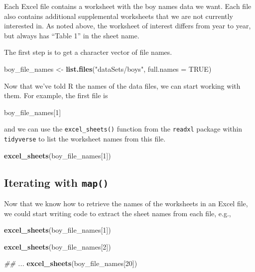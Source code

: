 \documentclass[]{book}
\newenvironment{Shaded}{\begin{snugshade}}{\end{snugshade}}
\newcommand{\CommentTok}[1]{\textcolor[rgb]{0.56,0.35,0.01}{\textit{#1}}}
\newcommand{\DataTypeTok}[1]{\textcolor[rgb]{0.13,0.29,0.53}{#1}}
\newcommand{\DecValTok}[1]{\textcolor[rgb]{0.00,0.00,0.81}{#1}}
\newcommand{\KeywordTok}[1]{\textcolor[rgb]{0.13,0.29,0.53}{\textbf{#1}}}
\newcommand{\NormalTok}[1]{#1}
\newcommand{\OtherTok}[1]{\textcolor[rgb]{0.56,0.35,0.01}{#1}}
\newcommand{\StringTok}[1]{\textcolor[rgb]{0.31,0.60,0.02}{#1}}
\begin{document}
Each Excel file contains a worksheet with the boy names data we want.
Each file also contains additional supplemental worksheets that we are
not currently interested in. As noted above, the worksheet of interest
differs from year to year, but always has ``Table 1'' in the sheet name.

The first step is to get a character vector of file names.

\begin{Shaded}
\begin{Highlighting}[]
\NormalTok{boy_file_names <-}\StringTok{ }\KeywordTok{list.files}\NormalTok{(}\StringTok{"dataSets/boys"}\NormalTok{, }\DataTypeTok{full.names =} \OtherTok{TRUE}\NormalTok{)}
\end{Highlighting}
\end{Shaded}

Now that we've told R the names of the data files, we can start working
with them. For example, the first file is

\begin{Shaded}
\begin{Highlighting}[]
\NormalTok{boy_file_names[}\DecValTok{1}\NormalTok{]}
\end{Highlighting}
\end{Shaded}

and we can use the \texttt{excel\_sheets()} function from the \texttt{readxl} package
within \texttt{tidyverse} to list the worksheet names from this file.

\begin{Shaded}
\begin{Highlighting}[]
\KeywordTok{excel_sheets}\NormalTok{(boy_file_names[}\DecValTok{1}\NormalTok{])}
\end{Highlighting}
\end{Shaded}

\hypertarget{iterating-with-map}{%
\subsection{\texorpdfstring{Iterating with \texttt{map()}}{Iterating with map()}}\label{iterating-with-map}}

Now that we know how to retrieve the names of the worksheets in an
Excel file, we could start writing code to extract the sheet names from
each file, e.g.,

\begin{Shaded}
\begin{Highlighting}[]
\KeywordTok{excel_sheets}\NormalTok{(boy_file_names[}\DecValTok{1}\NormalTok{])}

\KeywordTok{excel_sheets}\NormalTok{(boy_file_names[}\DecValTok{2}\NormalTok{])}

\CommentTok{## ...}
\KeywordTok{excel_sheets}\NormalTok{(boy_file_names[}\DecValTok{20}\NormalTok{])}
\end{Highlighting}
\end{Shaded}
\end{document}
